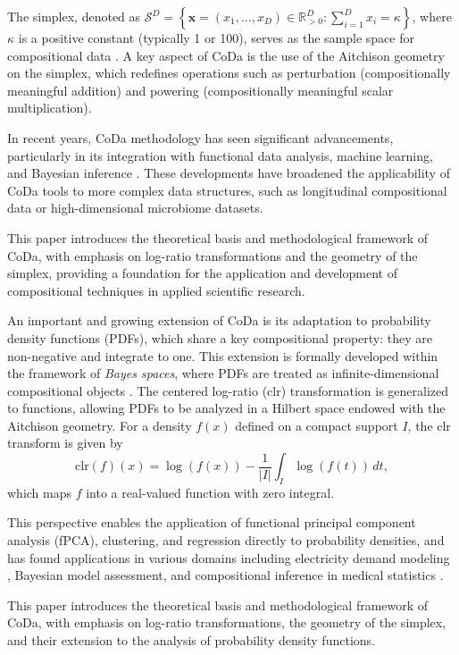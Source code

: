 \documentclass[article]{abntex2}
\begin{document}
The simplex, denoted as $\mathcal{S}^D = \left\{ \mathbf{x} = (x_1, \ldots, x_D) \in \mathbb{R}^D_{>0} : \sum_{i=1}^D x_i = \kappa \right\}$, where $\kappa$ is a positive constant (typically 1 or 100), serves as the sample space for compositional data \cite{egozcue2003isometric}. A key aspect of CoDa is the use of the Aitchison geometry on the simplex, which redefines operations such as perturbation (compositionally meaningful addition) and powering (compositionally meaningful scalar multiplication).

In recent years, CoDa methodology has seen significant advancements, particularly in its integration with functional data analysis, machine learning, and Bayesian inference \cite{van2013analyzing,greenacre2018compositional}. These developments have broadened the applicability of CoDa tools to more complex data structures, such as longitudinal compositional data or high-dimensional microbiome datasets.

This paper introduces the theoretical basis and methodological framework of CoDa, with emphasis on log-ratio transformations and the geometry of the simplex, providing a foundation for the application and development of compositional techniques in applied scientific research.


An important and growing extension of CoDa is its adaptation to probability density functions (PDFs), which share a key compositional property: they are non-negative and integrate to one. This extension is formally developed within the framework of \textit{Bayes spaces}, where PDFs are treated as infinite-dimensional compositional objects \cite{egozcue2006hilbert}. The centered log-ratio (clr) transformation is generalized to functions, allowing PDFs to be analyzed in a Hilbert space endowed with the Aitchison geometry. For a density $f(x)$ defined on a compact support $I$, the clr transform is given by
\[
\text{clr}(f)(x) = \log(f(x)) - \frac{1}{|I|} \int_I \log(f(t))\,dt,
\]
which maps $f$ into a real-valued function with zero integral.

This perspective enables the application of functional principal component analysis (fPCA), clustering, and regression directly to probability densities, and has found applications in various domains including electricity demand modeling \cite{delicado2011compositional}, Bayesian model assessment, and compositional inference in medical statistics \cite{talska2018principal}.

This paper introduces the theoretical basis and methodological framework of CoDa, with emphasis on log-ratio transformations, the geometry of the simplex, and their extension to the analysis of probability density functions.
\end{document}
